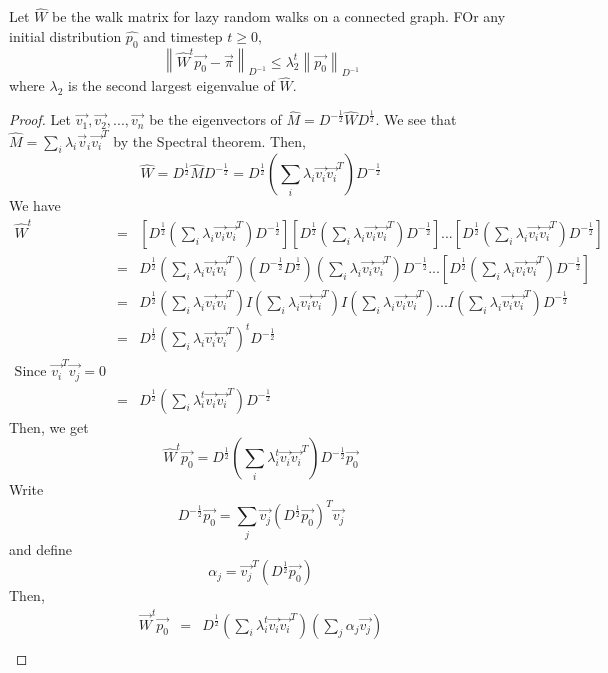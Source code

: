 \documentclass[12pt]{article}
\newcommand\norm[1]{\left\lVert#1\right\rVert}
\begin{document}
\begin{theorem}
Let $\widehat{W}$ be the walk matrix for lazy random walks on a connected graph. FOr any initial distribution $\hat{p_0}$ and timestep $t \geq 0,$ $$ \norm{\widehat{W}^t\vec{p_0}- \vec{\pi}}_{D^{-1}} \leq \lambda_2^t \norm{\vec{p_0}}_{D^{-1}}$$
where $\lambda_2$ is the second largest eigenvalue of $\widehat{W}$.
\end{theorem}
\begin{proof}
Let $\vec{v_1}, \vec{v_2}, ..., \vec{v_n}$ be the eigenvectors of $\hat{M} = D^{-\frac{1}{2}}\widehat{W}D^{\frac{1}{2}}.$ We see that $\widehat{M} = \sum_i \lambda_i\vec{v}_i\vec{v_i}^T$ by the Spectral theorem. Then, $$\hat{W} = D^{\frac{1}{2}}\hat{M}D^{-\frac{1}{2}} = D^{\frac{1}{2}}\left(\sum_i \lambda_i\vec{v_i}\vec{v_i}^T\right)D^{-\frac{1}{2}}$$ We have 
\begin{eqnarray*}
\widehat{W}^t &=& \left[D^{\frac{1}{2}}\left(\sum_i \lambda_i\vec{v_i}\vec{v_i}^T\right)D^{-\frac{1}{2}}\right]\left[D^{\frac{1}{2}}\left(\sum_i \lambda_i\vec{v_i}\vec{v_i}^T\right)D^{-\frac{1}{2}}\right]...\left[D^{\frac{1}{2}}\left(\sum_i \lambda_i\vec{v_i}\vec{v_i}^T\right)D^{-\frac{1}{2}}\right]\\
&=& D^{\frac{1}{2}}\left(\sum_i \lambda_i\vec{v_i}\vec{v_i}^T\right)\left(D^{-\frac{1}{2}}D^{\frac{1}{2}}\right)\left(\sum_i \lambda_i\vec{v_i}\vec{v_i}^T\right)D^{-\frac{1}{2}}...\left[D^{\frac{1}{2}}\left(\sum_i \lambda_i\vec{v_i}\vec{v_i}^T\right)D^{-\frac{1}{2}}\right]\\
&=& D^{\frac{1}{2}}\left(\sum_i \lambda_i\vec{v_i}\vec{v_i}^T\right)I\left(\sum_i \lambda_i\vec{v_i}\vec{v_i}^T\right)I\left(\sum_i \lambda_i\vec{v_i}\vec{v_i}^T\right)... I \left(\sum_i \lambda_i\vec{v_i}\vec{v_i}^T\right)D^{-\frac{1}{2}}\\
&=& D^{\frac{1}{2}}\left(\sum_i \lambda_i\vec{v_i}\vec{v_i}^T\right)^tD^{-\frac{1}{2}}\\
\text{Since } \vec{v_i}^T\vec{v_j} = 0\\
&=& D^{\frac{1}{2}} \left( \sum_i \lambda_i^t \vec{v_i} \vec{v_i}^T \right)D^{-\frac{1}{2}}
\end{eqnarray*}
Then, we get $$\widehat{W}^t\vec{p_0} = D^{\frac{1}{2}} \left( \sum_i \lambda_i^t \vec{v_i} \vec{v_i}^T \right)D^{-\frac{1}{2}}\vec{p_0}$$
Write $$D^{-\frac{1}{2}}\vec{p_0} = \sum_j \vec{v_j}\left( D^{\frac{1}{2}}\vec{p_0}\right)^T \vec{v_j}$$
and define $$\alpha_j = \vec{v_j}^T(D^{\frac{1}{2}}\vec{p_0})$$
Then,
\begin{eqnarray*}
\vec{W}^t\vec{p_0} &=& D^{\frac{1}{2}}\left( \sum_i \lambda_i^t\vec{v_i}\vec{v_i}^T\right)\left( \sum_j \alpha_j \vec{v_j}\right)\\

\end{eqnarray*}
\end{proof}
\end{document}
